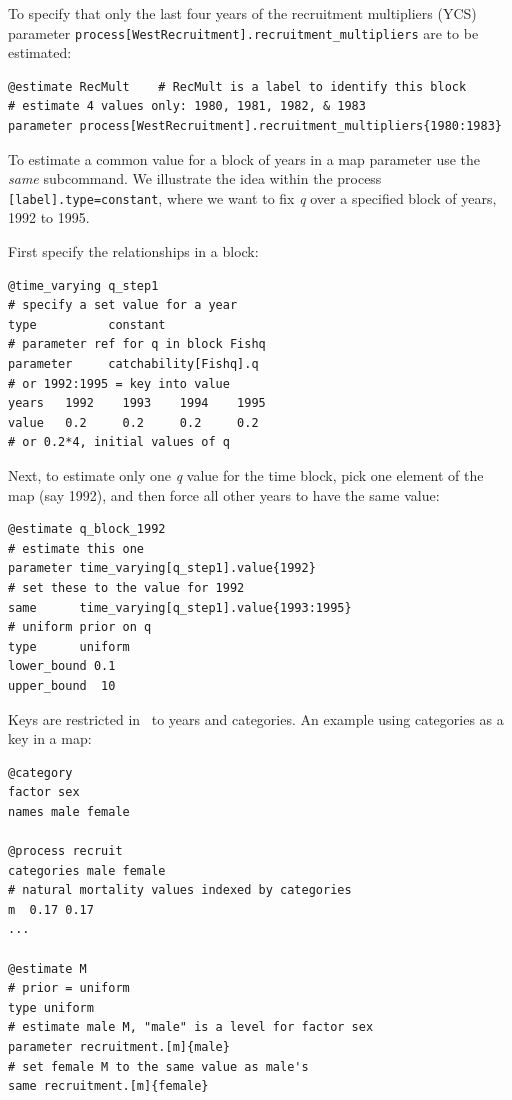 To specify that only the last four years of the recruitment multipliers (YCS) parameter \texttt{process[WestRecruitment].recruitment\_multipliers} are to be estimated:

{\small{\begin{verbatim}
@estimate RecMult    # RecMult is a label to identify this block
# estimate 4 values only: 1980, 1981, 1982, & 1983
parameter process[WestRecruitment].recruitment_multipliers{1980:1983}
\end{verbatim}}}

To estimate a common value for a block of years in a map parameter use the \textit{same} subcommand. We illustrate the idea within the process \texttt{[label].type=constant}, where we want to fix \textit{q} over a specified block of years, 1992 to 1995.

First specify the relationships in a  block:

{\small{\begin{verbatim}
@time_varying q_step1
# specify a set value for a year
type          constant
# parameter ref for q in block Fishq
parameter     catchability[Fishq].q
# or 1992:1995 = key into value
years 	1992	1993	1994	1995
value 	0.2		0.2		0.2		0.2
# or 0.2*4, initial values of q
\end{verbatim}}}

Next, to estimate only one \textit{q} value for the time block, pick one element of the map (say 1992), and then force all other years to have the same value:

{\small{\begin{verbatim}
@estimate q_block_1992
# estimate this one
parameter time_varying[q_step1].value{1992}
# set these to the value for 1992
same      time_varying[q_step1].value{1993:1995}
# uniform prior on q
type      uniform
lower_bound 0.1
upper_bound  10
\end{verbatim}}}

Keys are restricted in \CNAME\ to years and categories. An example using categories as a key in a map:

{\small{\begin{verbatim}
@category
factor sex
names male female

@process recruit
categories male female
# natural mortality values indexed by categories
m  0.17 0.17
...

@estimate M
# prior = uniform
type uniform
# estimate male M, "male" is a level for factor sex
parameter recruitment.[m]{male}
# set female M to the same value as male's
same recruitment.[m]{female}
\end{verbatim}}}

